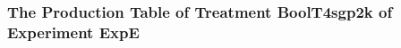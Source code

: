  \begin{frame}
 \fontsize{8pt}{9pt}\selectfont
 \frametitle{ The Production Table of Treatment BoolT4sgp2k of Experiment ExpE }

 \label{ExpEGrammarTable000.tex}  
 \end{frame}

